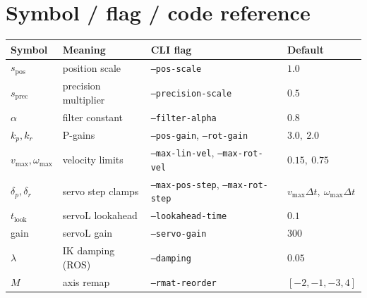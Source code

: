 \documentclass[11pt]{article}
\begin{document}
\section{Symbol / flag / code reference}
\begin{center}\small
\begin{tabular}{@{}llll@{}}
\toprule
Symbol & Meaning & CLI flag & Default \\
\midrule
$s_{\text{pos}}$ & position scale & \texttt{--pos-scale} & $1.0$ \\
$s_{\text{prec}}$ & precision multiplier & \texttt{--precision-scale} & $0.5$ \\
$\alpha$ & filter constant & \texttt{--filter-alpha} & $0.8$ \\
$k_p,k_r$ & P-gains & \texttt{--pos-gain}, \texttt{--rot-gain} & $3.0,\ 2.0$ \\
$v_{\max},\omega_{\max}$ & velocity limits & \texttt{--max-lin-vel}, \texttt{--max-rot-vel} & $0.15,\ 0.75$ \\
$\delta_p,\delta_r$ & servo step clamps & \texttt{--max-pos-step}, \texttt{--max-rot-step} & $v_{\max}\Delta t,\ \omega_{\max}\Delta t$ \\
$t_{\text{look}}$ & servoL lookahead & \texttt{--lookahead-time} & $0.1$ \\
gain & servoL gain & \texttt{--servo-gain} & $300$ \\
$\lambda$ & IK damping (ROS) & \texttt{--damping} & $0.05$ \\
$M$ & axis remap & \texttt{--rmat-reorder} & $[-2,-1,-3,4]$ \\
\bottomrule
\end{tabular}
\end{center}
\end{document}
